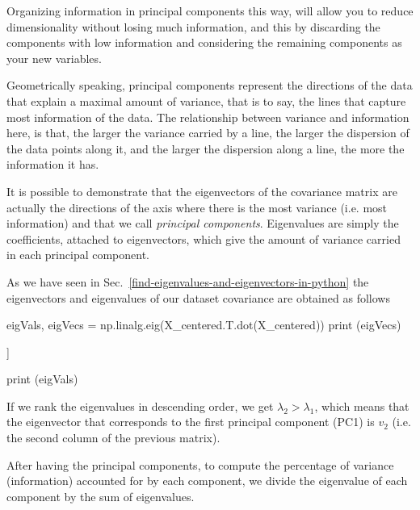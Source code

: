 Organizing information in principal components this way, will allow you to reduce dimensionality without losing much information, and this by discarding the components with low information and considering the remaining components as your new variables.

Geometrically speaking, principal components represent the directions of the data that explain a maximal amount of variance, that is to say, the lines that capture most information of the data. The relationship between variance and information here, is that, the larger the variance carried by a line, the larger the dispersion of the data points along it, and the larger the dispersion along a line, the more the information it has.

It is possible to demonstrate that the eigenvectors of the covariance matrix are actually the directions of the axis where there is the most variance (i.e. most information) and that we call \emph{principal components}. Eigenvalues are simply the coefficients, attached to eigenvectors, which give the amount of variance carried in each principal component.

As we have seen in Sec.~\ref{find-eigenvalues-and-eigenvectors-in-python} the eigenvectors and eigenvalues of our dataset covariance are obtained as follows

\begin{ipython}
eigVals, eigVecs = np.linalg.eig(X_centered.T.dot(X_centered))
print (eigVecs)
\end{ipython}
\begin{ioutput}
[[-0.70710678 -0.70710678]
 [ 0.70710678 -0.70710678]]
\end{ioutput}

\begin{ipython}
print (eigVals)
\end{ipython}
\begin{ioutput}
[  7.46600865 192.53399135]
\end{ioutput}

If we rank the eigenvalues in descending order, we get $\lambda_2>\lambda_1$, which means that the eigenvector that corresponds to the first principal component (PC1) is  $v_2$ (i.e. the second column of the previous matrix).

After having the principal components, to compute the percentage of variance (information) accounted for by each component, we divide the eigenvalue of each component by the sum of eigenvalues. 

